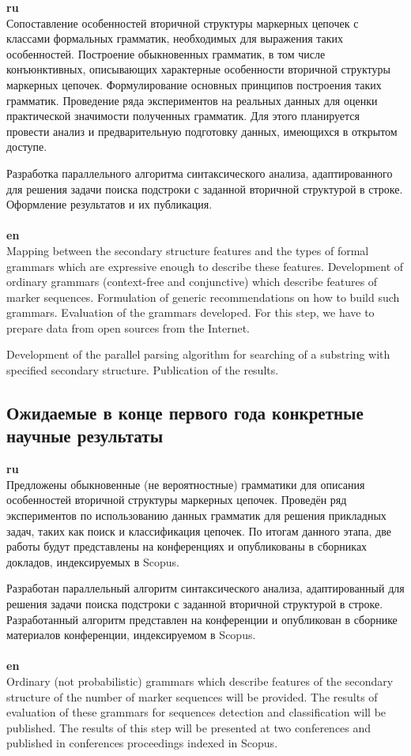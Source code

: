 \documentclass[12pt]{article}  %
\theoremstyle{remark}
\begin{document}
\textbf{ru}\\
Сопоставление особенностей вторичной структуры маркерных цепочек с классами формальных грамматик, необходимых для выражения таких особенностей. Построение обыкновенных грамматик, в том числе конъюнктивных, описывающих характерные особенности вторичной структуры маркерных цепочек.
Формулирование основных принципов построения таких грамматик.
Проведение ряда экспериментов на реальных данных для оценки практической значимости полученных грамматик. Для этого планируется провести анализ и предварительную подготовку данных, имеющихся в открытом доступе.

Разработка параллельного алгоритма синтаксического анализа, адаптированного для решения задачи поиска подстроки с заданной вторичной структурой в строке.
Оформление результатов и их публикация.
\\
\\
\textbf{en}\\
Mapping between the secondary structure features and the types of formal grammars which are expressive enough to describe these features.
Development of ordinary grammars (context-free and conjunctive) which describe features of marker sequences.
Formulation of generic recommendations on how to build such grammars.
Evaluation of the grammars developed. For this step, we have to prepare data from open sources from the Internet.

Development of the parallel parsing algorithm for searching of a substring with specified secondary structure.
Publication of the results.

\subsection{Ожидаемые в конце первого года конкретные научные результаты}

\textbf{ru}\\
Предложены обыкновенные (не вероятностные) грамматики для описания особенностей вторичной структуры маркерных цепочек.
Проведён ряд экспериментов по использованию данных грамматик для решения прикладных задач, таких как поиск и классификация цепочек.
По итогам данного этапа, две работы будут представлены на конференциях и опубликованы в сборниках докладов, индексируемых в Scopus.

Разработан параллельный алгоритм синтаксического анализа, адаптированный для решения задачи поиска подстроки с заданной вторичной структурой в строке.
Разработанный алгоритм представлен на конференции и опубликован в сборнике материалов конференции, индексируемом в Scopus.
\\
\\
\textbf{en}\\
Ordinary (not probabilistic) grammars which describe features of the secondary structure of the number of marker sequences will be provided.
The results of evaluation of these grammars for sequences detection and classification will be published.
The results of this step will be presented at two conferences and published in conferences proceedings indexed in Scopus.
\end{document}
